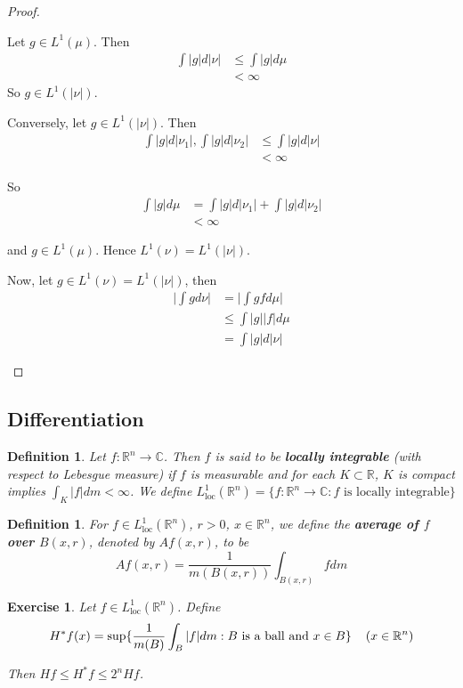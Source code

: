 \documentclass[12pt]{amsart}
\newtheorem{defn}[thm]{Definition}
\newtheorem{ex}[thm]{Exercise}
\newcommand{\C}{\mathbb{C}}
\newcommand{\R}{\mathbb{R}}
\newcommand{\Ll}{L^1_{\text{loc}}(\R^n)}
\begin{document}
\begin{proof}
\begin{enumerate}
Let $g \in L^1(\mu)$. Then 
\begin{align*}
\int |g| d |\nu| 
&\leq \int |g| d \mu \\
&< \infty
\end{align*}
So $g \in L^1(|\nu|)$.

Conversely, let $g \in L^1(|\nu|)$. Then 
\begin{align*}
\int |g| d|\nu_1|, \int |g| d |\nu_2| 
& \leq \int |g|d |\nu|\\
& < \infty
\end{align*}

So 
\begin{align*}
\int |g| d\mu
& =\int |g| d|\nu_1| + \int |g| d |\nu_2| \\
& < \infty
\end{align*}

and $g \in L^1(\mu)$. Hence $L^1(\nu) = L^1(|\nu|)$. 

Now, let $g \in L^1(\nu) = L^1(|\nu|)$, then 
\begin{align*}
\bigg| \int g d\nu \bigg| 
&= \bigg| \int g f d\mu \bigg| \\
& \leq \int |g||f|d\mu\\
& = \int |g| d |\nu|
\end{align*}

\end{enumerate}
\end{proof}

\subsection{Differentiation}

\begin{defn}
Let $f: \R^n \rightarrow \C$. Then $f$ is said to be \textbf{locally integrable} (with respect to Lebesgue measure) if $f$ is measurable and for each $K \subset \R$, $K$ is compact implies $\int_K |f| dm < \infty$. We define $L^1_{\text{loc}}(\R^n) = \{f:\R^n \rightarrow \C: f \text{ is locally integrable}\}$
\end{defn}

\begin{defn}
For $f \in \Ll$, $r>0$, $x \in \R^n$, we define the \textbf{average of $f$ over $B(x,r)$}, denoted by $Af(x,r)$, to be $$Af(x,r) = \frac{1}{m(B(x,r))}\int_{B(x,r)}fdm$$
\end{defn}

\begin{ex}
Let $f \in \Ll$. Define $$H^*f(x) = \sup\{\frac{1}{m(B)}\int_{B}|f|dm: B \text{ is a ball and } x \in B\} \hspace{4mm} (x \in \R^n)$$

Then $Hf \leq H^*f \leq 2^n Hf$. 
\end{ex}
\end{document}
